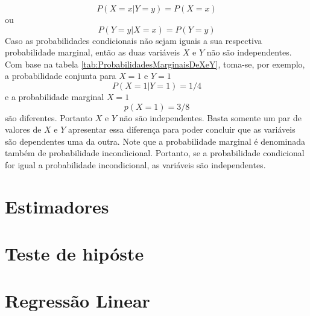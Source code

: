 \documentclass[
]{book}
\begin{document}
\[
P(X=x|Y=y) = P(X=x)
\]
ou
\[
P(Y=y|X=x) = P(Y=y)
\]
Caso as probabilidades condicionais não sejam iguais a sua respectiva probabilidade marginal, então as duas variáveis \(X\) e \(Y\) não são independentes. Com base na tabela \ref{tab:ProbabilidadesMarginaisDeXeY}, toma-se, por exemplo,
a probabilidade conjunta para \(X=1\) e \(Y=1\)
\[
  P(X=1|Y=1) =1/4
\]
e a probabilidade marginal \(X=1\)
\[
  p(X=1) = 3/8
\]
são diferentes. Portanto \(X\) e \(Y\) não são independentes. Basta somente um par de valores de \(X\) e \(Y\) apresentar essa diferença para poder concluir que as variáveis são dependentes uma da outra. Note que a probabilidade marginal é denominada também de probabilidade incondicional. Portanto, se a probabilidade condicional for igual a probabilidade incondicional, as variáveis são independentes.

\hypertarget{estimadores}{%
\chapter{Estimadores}\label{estimadores}}

\hypertarget{teste-de-hipuxf3ste}{%
\chapter{Teste de hipóste}\label{teste-de-hipuxf3ste}}

\hypertarget{regressuxe3o-linear}{%
\chapter{Regressão Linear}\label{regressuxe3o-linear}}

  
\end{document}
